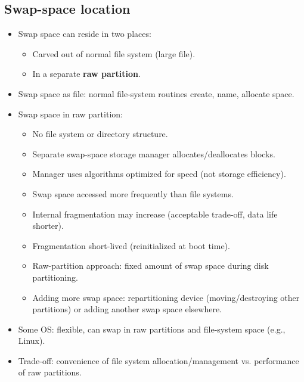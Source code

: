 \subsection{Swap-space location}
\begin{itemize}
    \item Swap space can reside in two places:
    \begin{itemize}
        \item Carved out of normal file system (large file).
        \item In a separate \textbf{raw partition}.
    \end{itemize}
    \item Swap space as file: normal file-system routines create, name, allocate space.
    \item Swap space in raw partition:
    \begin{itemize}
        \item No file system or directory structure.
        \item Separate swap-space storage manager allocates/deallocates blocks.
        \item Manager uses algorithms optimized for speed (not storage efficiency).
        \item Swap space accessed more frequently than file systems.
        \item Internal fragmentation may increase (acceptable trade-off, data life shorter).
        \item Fragmentation short-lived (reinitialized at boot time).
        \item Raw-partition approach: fixed amount of swap space during disk partitioning.
        \item Adding more swap space: repartitioning device (moving/destroying other partitions) or adding another swap space elsewhere.
    \end{itemize}
    \item Some OS: flexible, can swap in raw partitions and file-system space (e.g., Linux).
    \item Trade-off: convenience of file system allocation/management vs. performance of raw partitions.
\end{itemize}

